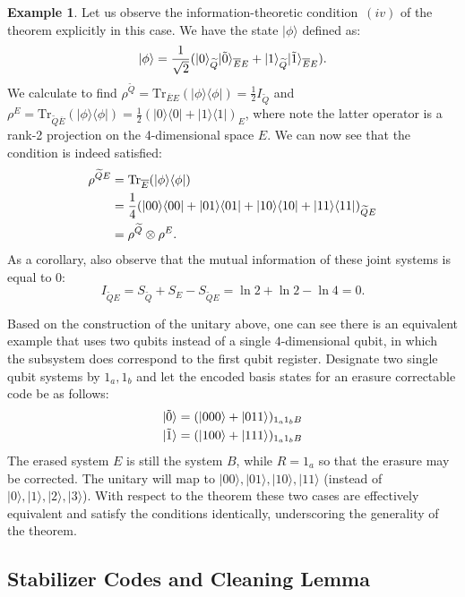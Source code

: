 \documentclass[11pt]{amsart}
\theoremstyle{definition}
\newtheorem{example}[thm]{Example}
\theoremstyle{definition}
\theoremstyle{definition}
\newcommand{\tr}{\textrm{Tr}}
\newcommand{\1}{\mathbb{I}}
\newcommand{\T}[1]{\widetilde{#1}} %
\newcommand{\B}[1]{\overline{#1}} %
\def\ket#1{| #1 \rangle}
\def\bra#1{\langle #1 |}
\def\kb#1#2{|#1\rangle\!\langle #2 |}
\begin{document}
\begin{example}
Let us observe the information-theoretic condition~$(iv)$ of the theorem explicitly in this case. We have the state $\ket{\phi}$ defined as: 
    \begin{align}
        \ket{\phi} = \frac{1}{\sqrt{2}}(\ket{0}_{\T{Q}}\ket{\Tilde{0}}_{\B{E}E}+\ket{1}_{\T{Q}}\ket{\Tilde{1}}_{\B{E}E}). 
    \end{align}
    We calculate to find $\rho^{\T{Q}} = \tr_{\overline{E}E}(\kb{\phi}{\phi}) = \frac12 I_{\T{Q}}$ and $\rho^{E} = \tr_{\T{Q}\overline{E}}(\kb{\phi}{\phi}) = \frac12 (\kb{0}{0} + \kb{1}{1})_E$, where note the latter operator is a rank-2 projection on the 4-dimensional space $E$. We can now see that the condition is indeed satisfied:  
    \begin{align}
        \rho^{\T{Q}E} &= \tr_{\B{E}} ( \ket{\phi}\bra{\phi} ) \notag \\
        &= \frac{1}{4}(\ket{00}\bra{00}+\ket{01}\bra{01}+\ket{10}\bra{10}+\ket{11}\bra{11})_{\T{Q}E}  \notag \\
        &= \rho^{\T{Q}}\otimes\rho^E . 
    \end{align}
    As a corollary, also observe that the mutual information of these joint systems is equal to $0$: 
    \[
        I_{\T{Q}E} =S_{\T{Q}}+S_E-S_{\T{Q}E} 
        = \ln{2}+\ln{2}-\ln{4} 
        = 0 . 
    \]

Based on the construction of the unitary above, one can see there is an equivalent example that uses two qubits instead of a single $4$-dimensional qubit, in which the subsystem does correspond to the first qubit register.
Designate two single qubit systems by $1_a, 1_b$ and let the encoded basis states for an erasure correctable code be as follows:
    \begin{align}
        \ket{\Tilde{0}} = (\ket{000}+\ket{011})_{1_a1_bB} \notag \\
        \ket{\Tilde{1}} = (\ket{100}+\ket{111})_{1_a1_bB} \notag
    \end{align}
    The erased system $E$ is still the system $B$, while $R=1_a$ so that the erasure may be corrected.
    The unitary will map to $\ket{00},\ket{01},\ket{10},\ket{11}$ (instead of $\ket{0},\ket{1},\ket{2},\ket{3}$).
With respect to the theorem these two cases are effectively equivalent and satisfy the conditions identically, underscoring the generality of the theorem.
\end{example}    

\subsection{Stabilizer Codes and Cleaning Lemma}
\end{document}
